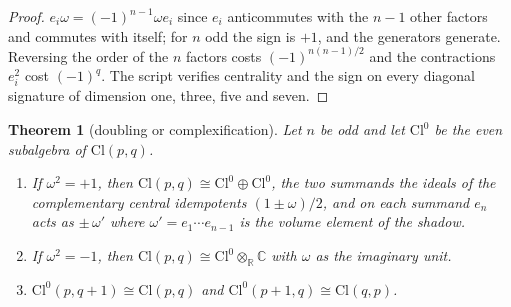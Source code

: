 \documentclass[11pt]{article}
\newtheorem{theorem}{Theorem}[section]
\theoremstyle{definition}
\newcommand{\Cl}{\mathrm{Cl}}
\newcommand{\R}{\mathbb{R}}
\newcommand{\C}{\mathbb{C}}
\begin{document}
\begin{proof}
$e_{i}\omega = (-1)^{n-1}\omega e_{i}$ since $e_{i}$ anticommutes with the $n - 1$ other factors and commutes with itself; for $n$ odd the sign is $+1$, and the generators generate. Reversing the order of the $n$ factors costs $(-1)^{n(n-1)/2}$ and the contractions $e_{i}^{2}$ cost $(-1)^{q}$. The script verifies centrality and the sign on every diagonal signature of dimension one, three, five and seven.
\end{proof}

\begin{theorem}[doubling or complexification]\label{thm:split}
Let $n$ be odd and let $\Cl^{0}$ be the even subalgebra of $\Cl(p,q)$.
\begin{enumerate}
\item[(i)] If $\omega^{2} = +1$, then $\Cl(p,q) \cong \Cl^{0} \oplus \Cl^{0}$, the two summands the ideals of the complementary central idempotents $(1 \pm \omega)/2$, and on each summand $e_{n}$ acts as $\pm\,\omega' $ where $\omega' = e_{1}\cdots e_{n-1}$ is the volume element of the shadow.
\item[(ii)] If $\omega^{2} = -1$, then $\Cl(p,q) \cong \Cl^{0} \otimes_{\R} \C$ with $\omega$ as the imaginary unit.
\item[(iii)] $\Cl^{0}(p, q+1) \cong \Cl(p,q)$ and $\Cl^{0}(p+1, q) \cong \Cl(q,p)$.
\end{enumerate}
\end{theorem}
\end{document}
